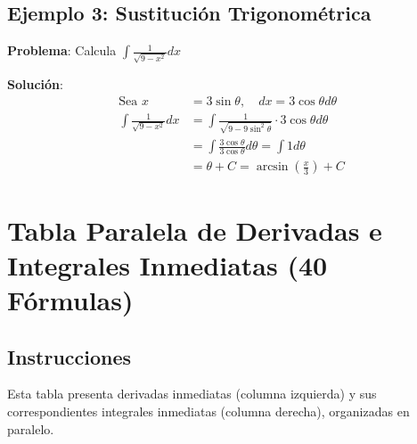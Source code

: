 \documentclass{article}
\newcommand{\formula}[1]{\ensuremath{#1}}
\begin{document}
\subsection{Ejemplo 3: Sustitución Trigonométrica}
\begin{examplebox}
\textbf{Problema}: Calcula \formula{\int \frac{1}{\sqrt{9-x^2}} dx}

\textbf{Solución}:
\begin{align*}
\text{Sea } x &= 3\sin\theta, \quad dx = 3\cos\theta d\theta \\
\int \frac{1}{\sqrt{9-x^2}} dx &= \int \frac{1}{\sqrt{9-9\sin^2\theta}} \cdot 3\cos\theta d\theta \\
&= \int \frac{3\cos\theta}{3\cos\theta} d\theta = \int 1 d\theta \\
&= \theta + C = \arcsin\left(\frac{x}{3}\right) + C
\end{align*}
\end{examplebox}

\newpage
\section{Tabla Paralela de Derivadas e Integrales Inmediatas (40 Fórmulas)}
\label{sec:tabla_paralela_completa_parte1}

\subsection*{Instrucciones}
Esta tabla presenta derivadas inmediatas (columna izquierda) y sus correspondientes integrales inmediatas (columna derecha), organizadas en paralelo.
\end{document}
